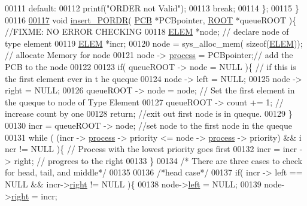 \begin{DoxyCode}
00111                 \textcolor{keywordflow}{default}:
00112                         printf(\textcolor{stringliteral}{"ORDER not Valid"});
00113                         \textcolor{keywordflow}{break};
00114                 \};
00115 \}
00116 
\hypertarget{mpx__r2_8c_source_l00117}{}\hyperlink{mpx__r2_8h_a9a582eea14fd6628937fb0891220fa82}{00117} \textcolor{keywordtype}{void} \hyperlink{mpx__r2_8c_a722f27bfb24e46ffd7eb86fb34024ed9}{insert_PORDR}( \hyperlink{structprocess}{PCB} *PCBpointer, \hyperlink{structroot}{ROOT} *queueROOT )\{ \textcolor{comment}{//FIXME: NO ERROR CHECKING
      }
00118         \hyperlink{structpage}{ELEM} *node; \textcolor{comment}{// declare node of type element}
00119         \hyperlink{structpage}{ELEM} *incr;
00120         node = sys\_alloc\_mem( \textcolor{keyword}{sizeof}(\hyperlink{structpage}{ELEM})); \textcolor{comment}{// allocate Memory for node}
00121         node -> \hyperlink{structprocess}{process} = PCBpointer;\textcolor{comment}{// add the PCB to the node}
00122         
00123         \textcolor{keywordflow}{if}( queueROOT -> node = NULL )\{ \textcolor{comment}{// if this is the first element ever in t
      he queque}
00124                 node -> left = NULL;
00125                 node -> right = NULL;
00126                 queueROOT -> node = node; \textcolor{comment}{// Set the first element in the queque 
      to node of Type Element}
00127                 queueROOT -> count += 1; \textcolor{comment}{// increase count by one}
00128                 \textcolor{keywordflow}{return}; \textcolor{comment}{//exit out first node is in queque. }
00129         \}
00130         incr = queueROOT -> node; \textcolor{comment}{//set node to the first node in the queque}
00131         \textcolor{keywordflow}{while} ( (incr -> \hyperlink{structprocess}{process} -> priority <= node -> \hyperlink{structprocess}{process} -> priority) && i
      ncr != NULL )\{ \textcolor{comment}{// Process with the lowest priority goes first }
00132                         incr = incr -> right; \textcolor{comment}{// progrees to the right }
00133         \}
00134         \textcolor{comment}{/* There are three cases to check for head, tail, and middle*/}
00135         
00136         \textcolor{comment}{/*head case*/}
00137         \textcolor{keywordflow}{if}( incr -> left == NULL && incr->\hyperlink{structpage_a59bb1b5eca2d579befcc93a2833f4dfd}{right} != NULL )\{ 
00138                 node->\hyperlink{structpage_a450d16b8cb803158a4dab05bb36fd7f5}{left} = NULL;
00139                 node->\hyperlink{structpage_a59bb1b5eca2d579befcc93a2833f4dfd}{right} = incr;

\end{DoxyCode}
